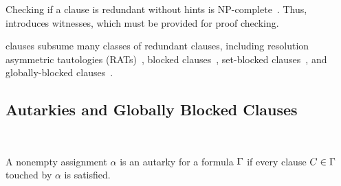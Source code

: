 




Checking if a clause is redundant without hints is NP-complete~\cite{prclause}. Thus, \pr introduces witnesses, which must be provided for proof checking.

\pr clauses subsume many classes of redundant clauses, including resolution asymmetric tautologies (RATs)~\cite{rat}, blocked clauses~\cite{blockedclause}, set-blocked clauses~\cite{setblocked}, and globally-blocked clauses~\cite{conditionalautarkies}.

\subsection{Autarkies and Globally Blocked Clauses}~\label{subsec:autarkies}


\begin{definition}[Autarky]
    A nonempty assignment $\alpha$ is an autarky for a formula $\Gamma$ if every clause $C \in \Gamma$ touched by $\alpha$ is satisfied.
\end{definition}


